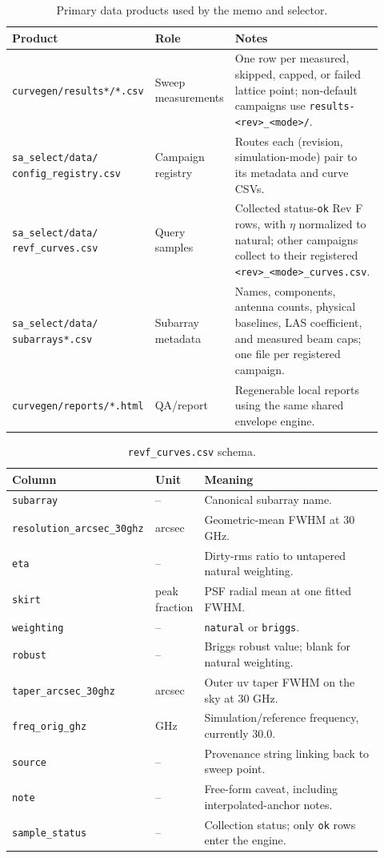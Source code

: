 \documentclass[11pt]{article}
\begin{document}
\begin{table}[tb]
\centering
\small
\caption{Primary data products used by the memo and selector.}
\label{tab:products}
\begin{tabular}{@{}p{0.34\linewidth}p{0.14\linewidth}p{0.44\linewidth}@{}}
\toprule
Product & Role & Notes \\
\midrule
\texttt{curvegen/results*/*.csv} &
Sweep measurements &
One row per measured, skipped, capped, or failed lattice point; non-default
campaigns use \texttt{results-} \texttt{<rev>\_<mode>/}. \\
\texttt{sa\_select/data/} \texttt{config\_registry.csv} &
Campaign registry &
Routes each (revision, simulation-mode) pair to its metadata and curve CSVs. \\
\texttt{sa\_select/data/} \texttt{revf\_curves.csv} &
Query samples &
Collected status-\texttt{ok} Rev F rows, with $\eta$ normalized to natural;
other campaigns collect to their registered
\texttt{<rev>\_<mode>\_curves.csv}. \\
\texttt{sa\_select/data/} \texttt{subarrays*.csv} &
Subarray metadata &
Names, components, antenna counts, physical baselines, LAS coefficient, and
measured beam caps; one file per registered campaign. \\
\texttt{curvegen/reports/*.html} &
QA/report &
Regenerable local reports using the same shared envelope engine. \\
\bottomrule
\end{tabular}
\end{table}

\begin{table}[tb]
\centering
\small
\caption{\texttt{revf\_curves.csv} schema.}
\label{tab:schema}
\begin{tabular}{@{}p{0.32\linewidth}p{0.12\linewidth}p{0.48\linewidth}@{}}
\toprule
Column & Unit & Meaning \\
\midrule
\texttt{subarray} & -- & Canonical subarray name. \\
\texttt{resolution\_arcsec\_30ghz} & arcsec & Geometric-mean FWHM at 30 GHz. \\
\texttt{eta} & -- & Dirty-rms ratio to untapered natural weighting. \\
\texttt{skirt} & peak fraction & PSF radial mean at one fitted FWHM. \\
\texttt{weighting} & -- & \texttt{natural} or \texttt{briggs}. \\
\texttt{robust} & -- & Briggs robust value; blank for natural weighting. \\
\texttt{taper\_arcsec\_30ghz} & arcsec & Outer uv taper FWHM on the sky at 30 GHz. \\
\texttt{freq\_orig\_ghz} & GHz & Simulation/reference frequency, currently 30.0. \\
\texttt{source} & -- & Provenance string linking back to sweep point. \\
\texttt{note} & -- & Free-form caveat, including interpolated-anchor notes. \\
\texttt{sample\_status} & -- & Collection status; only \texttt{ok} rows enter the engine. \\
\bottomrule
\end{tabular}
\end{table}
\end{document}

